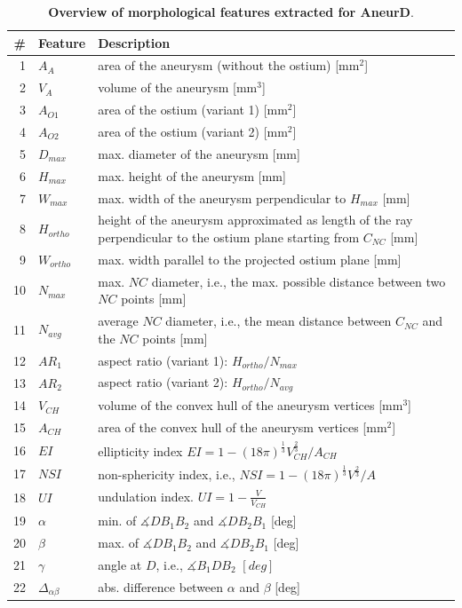 \documentclass[
  oneside]{book}
\begin{document}
\begin{table}

\caption{\label{tab:09-morphological-features}\textbf{Overview of morphological features extracted for AneurD}.}
\centering
\begin{tabular}[t]{rl>{\raggedright\arraybackslash}p{12cm}}
\toprule
\textbf{\#} & \textbf{Feature} & \textbf{Description}\\
\midrule
1 & $A_A$ & area of the aneurysm (without the ostium) [mm$^2$]\\
2 & $V_A$ & volume of the aneurysm [mm$^3$]\\
3 & $A_{O1}$ & area of the ostium (variant 1) [mm$^2$]\\
4 & $A_{O2}$ & area of the ostium (variant 2) [mm$^2$]\\
5 & $D_{max}$ & max. diameter of the aneurysm [mm]\\
6 & $H_{max}$ & max. height of the aneurysm [mm]\\
7 & $W_{max}$ & max. width of the aneurysm perpendicular to $H_{max}$ [mm]\\
8 & $H_{ortho}$ & height of the aneurysm approximated as length of the ray perpendicular to the ostium plane starting from $C_{NC}$ [mm]\\
9 & $W_{ortho}$ & max. width parallel to the projected ostium plane [mm]\\
10 & $N_{max}$ & max. $NC$ diameter, i.e., the max. possible distance between two $NC$ points [mm]\\
11 & $N_{avg}$ & average $NC$ diameter, i.e., the mean distance between $C_{NC}$ and the $NC$ points [mm]\\
12 & $AR_1$ & aspect ratio (variant 1): $H_{ortho}/N_{max}$\\
13 & $AR_2$ & aspect ratio (variant 2): $H_{ortho}/N_{avg}$\\
14 & $V_{CH}$ & volume of the convex hull of the aneurysm vertices [mm$^3$]\\
15 & $A_{CH}$ & area of the convex hull of the aneurysm vertices [mm$^2$]\\
16 & $EI$ & ellipticity index $EI=1-\left(18\pi\right)^{\frac{1}{3}}V_{CH}^{\frac{2}{3}}/A_{CH}$\\
17 & $NSI$ & non-sphericity index, i.e.,  $NSI=1-\left(18\pi\right)^{\frac{1}{3}}V^{\frac{2}{3}}/A$\\
18 & $UI$ & undulation index. $UI=1-\frac{V}{V_{CH}}$\\
19 & $\alpha$ & min. of $\measuredangle DB_1B_2$ and $\measuredangle DB_2B_1$ [deg]\\
20 & $\beta$ & max. of $\measuredangle DB_1B_2$ and $\measuredangle DB_2B_1$ [deg]\\
21 & $\gamma$ & angle at $D$, i.e., $\measuredangle B_1DB_2$ $[deg]$\\
22 & $\Delta_{\alpha\beta}$ & abs. difference between $\alpha$ and $\beta$ [deg]\\
\bottomrule
\end{tabular}
\end{table}
\end{document}

